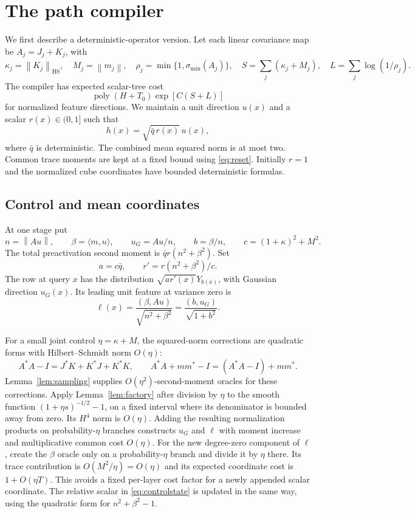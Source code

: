 \documentclass[11pt]{article}
\theoremstyle{remark}\newtheorem{remark}[theorem]{Remark}
\newcommand{\HS}{\mathrm{HS}}
\newcommand{\poly}{\operatorname{poly}}
\newcommand{\norm}[1]{\left\lVert #1\right\rVert}
\begin{document}
\section{The path compiler}

We first describe a deterministic-operator version. Let each linear
covariance map be $A_j=J_j+K_j$, with
\[
 \kappa_j=\norm{K_j}_\HS,\quad M_j=\norm{m_j},\quad
 \rho_j=\min\{1,\sigma_{\min}(A_j)\},\quad
 S=\sum_j(\kappa_j+M_j),\quad L=\sum_j\log(1/\rho_j).
\]
The compiler has expected scalar-tree cost
\begin{equation}\label{eq:compilerbudget}
 \poly(H+T_0)\exp[C(S+L)]
\end{equation}
for normalized feature directions. We maintain a unit direction $u(x)$
and a scalar $r(x)\in(0,1]$ such that
\[
 h(x)=\sqrt{\bar q\,r(x)}\,u(x),
\]
where $\bar q$ is deterministic. The combined mean squared norm is at
most two. Common trace moments are kept at a fixed bound using
\eqref{eq:reset}. Initially $r=1$ and the normalized cube coordinates
have bounded deterministic formulas.

\subsection{Control and mean coordinates}

At one stage put
\[
 n=\norm{Au},\qquad\beta=\langle m,u\rangle,\qquad
 u_G=Au/n,\qquad b=\beta/n,\qquad
 c=(1+\kappa)^2+M^2.
\]
The total preactivation second moment is $\bar q r(n^2+\beta^2)$.
Set
\begin{equation}\label{eq:controlstate}
 a=c\bar q,\qquad r'=r(n^2+\beta^2)/c.
\end{equation}
The row at query $x$ has the distribution
$\sqrt{a r'(x)}Y_{b(x)}$, with Gaussian direction $u_G(x)$.
Its leading unit feature at variance zero is
\begin{equation}\label{eq:leading}
 \ell(x)=\frac{(\beta,Au)}{\sqrt{n^2+\beta^2}}
        =\frac{(b,u_G)}{\sqrt{1+b^2}}.
\end{equation}

For a small joint control $\eta=\kappa+M$, the squared-norm corrections
are quadratic forms with Hilbert--Schmidt norm $O(\eta)$:
\[
 A^*A-I=J^*K+K^*J+K^*K,\qquad
 A^*A+mm^*-I=(A^*A-I)+mm^*.
\]
Lemma~\ref{lem:sampling} supplies $O(\eta^2)$-second-moment oracles for
these corrections. Apply Lemma~\ref{lem:factory} after division by
$\eta$ to the smooth function
$(1+\eta s)^{-1/2}-1$, on a fixed interval where its denominator is
bounded away from zero. Its $H^4$ norm is $O(\eta)$. Adding the resulting
normalization products on probability-$\eta$ branches constructs $u_G$
and $\ell$ with moment increase and multiplicative common cost $O(\eta)$.
For the new degree-zero component of $\ell$, create the $\beta$ oracle
only on a probability-$\eta$ branch and divide it by $\eta$ there.
Its trace contribution is $O(M^2/\eta)=O(\eta)$ and its expected
coordinate cost is $1+O(\eta T)$. This avoids a fixed per-layer cost
factor for a newly appended scalar coordinate.
The relative scalar in \eqref{eq:controlstate} is updated in the same way,
using the quadratic form for $n^2+\beta^2-1$.
\end{document}
